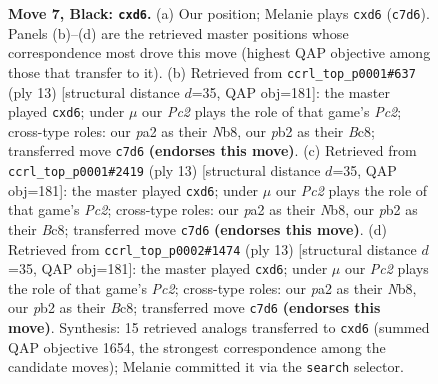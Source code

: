 \documentclass[11pt]{article}
\begin{document}
\begin{figure}[p]
\caption{\textbf{Move 7, Black: \texttt{cxd6}.} (a) Our position; Melanie plays \texttt{cxd6} (\texttt{c7d6}). Panels (b)--(d) are the retrieved master positions whose correspondence most drove this move (highest QAP objective among those that transfer to it). (b) Retrieved from \texttt{ccrl\_top\_p0001\#637} (ply 13) [structural distance $d$=35, QAP obj=181]: the master played \texttt{cxd6}; under $\mu$ our \emph{Pc2} plays the role of that game's \emph{Pc2}; cross-type roles: our \emph{p}a2 as their \emph{N}b8, our \emph{p}b2 as their \emph{B}c8; transferred move \texttt{c7d6} \textbf{(endorses this move)}. (c) Retrieved from \texttt{ccrl\_top\_p0001\#2419} (ply 13) [structural distance $d$=35, QAP obj=181]: the master played \texttt{cxd6}; under $\mu$ our \emph{Pc2} plays the role of that game's \emph{Pc2}; cross-type roles: our \emph{p}a2 as their \emph{N}b8, our \emph{p}b2 as their \emph{B}c8; transferred move \texttt{c7d6} \textbf{(endorses this move)}. (d) Retrieved from \texttt{ccrl\_top\_p0002\#1474} (ply 13) [structural distance $d$=35, QAP obj=181]: the master played \texttt{cxd6}; under $\mu$ our \emph{Pc2} plays the role of that game's \emph{Pc2}; cross-type roles: our \emph{p}a2 as their \emph{N}b8, our \emph{p}b2 as their \emph{B}c8; transferred move \texttt{c7d6} \textbf{(endorses this move)}. Synthesis: 15 retrieved analogs transferred to \texttt{cxd6} (summed QAP objective 1654, the strongest correspondence among the candidate moves); Melanie committed it via the \texttt{search} selector.}
\label{fig:thought-m13}
\end{figure}

\clearpage
\end{document}
